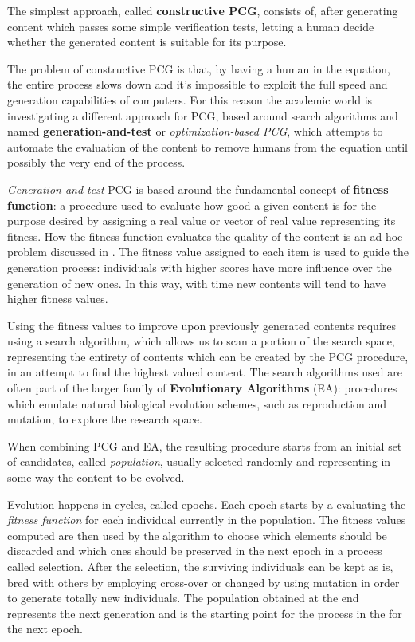 The simplest approach, called \textbf{constructive PCG}, consists of, after generating content which passes some simple verification tests, letting a human decide whether the generated content is suitable for its purpose. 


The problem of constructive PCG is that, by having a human in the equation, the entire process slows down and it’s impossible to exploit the full speed and generation capabilities of computers. For this reason the academic world is investigating a different approach for PCG, based around search algorithms and named \textbf{generation-and-test} or \textit{optimization-based PCG}, which attempts to automate the evaluation of the content to remove humans from the equation until possibly the very end of the process.

\textit{Generation-and-test} PCG is based around the fundamental concept of \textbf{fitness function}: a procedure used to evaluate how good a given content is for the purpose desired by assigning a real value or vector of real value representing its fitness. How the fitness function evaluates the quality of the content is an ad-hoc problem discussed in . The fitness value assigned to each item is used to guide the generation process: individuals with higher scores have more influence over the generation of new ones. In this way, with time new contents will tend to have higher fitness values.

Using the fitness values to improve upon previously generated contents requires using a search algorithm, which allows us to scan a portion of the search space, representing the entirety of contents which can be created by the PCG procedure, in an attempt to find the highest valued content. 
The search algorithms used are often part of the larger family of \textbf{Evolutionary Algorithms} (EA): procedures which emulate natural biological evolution schemes, such as reproduction and mutation, to explore the research space.

When combining PCG and EA, the resulting procedure starts from an initial set of candidates, called \textit{population}, usually selected randomly and representing in some way the content to be evolved. 

Evolution happens in cycles, called epochs. Each epoch starts by a evaluating the \textit{fitness function} for each individual currently in the population. The fitness values computed are then used by the algorithm to choose which elements should be discarded and which ones should be preserved in the next epoch in a process called selection. After the selection, the surviving individuals can be kept as is, bred with others by employing cross-over or changed by using mutation in order to generate totally new individuals. The population obtained at the end represents the next generation and is the starting point for the process in the for the next epoch.

